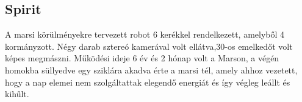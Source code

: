 \renewcommand{\xname}{Spirit}
\renewcommand{\x}{1.6}
\renewcommand{\y}{2.3}
\renewcommand{\z}{1.5}
\renewcommand{\weight}{35 (felszereléssel 180)}
\renewcommand{\img}{MobilisRobotok/Spirit/spirit.jpg}
\renewcommand{\sources}{Forrás:
https://en.wikipedia.org/wiki/Mars_Exploration_Rover}
\renewcommand{\captionn}{Spirit nevű Mars járó robot.}
\renewcommand{\watherProf}{Igen -3m ig.}
\renewcommand{\sebesseg}{0.05(avg 0.01)}
\renewcommand{\AcAndGy}{Igen}
\renewcommand{\GPS}{Igen}
\subsection*{Spirit}
 A marsi körülményekre tervezett robot 6 kerékkel rendelkezett, amelyből 4 kormányzott. Négy darab sztereó kamerával volt ellátva,30\degree-os emelkedőt volt képes megmászni. 
Működési ideje 6 év és 2 hónap volt a Marson, a végén homokba süllyedve egy sziklára akadva
érte a marsi tél, amely ahhoz vezetett, hogy a nap elemei nem szolgáltattak elegendő
energiát és így végleg leállt és kihűlt.

\renewcommand{\aspectratioPic}{0.5}



